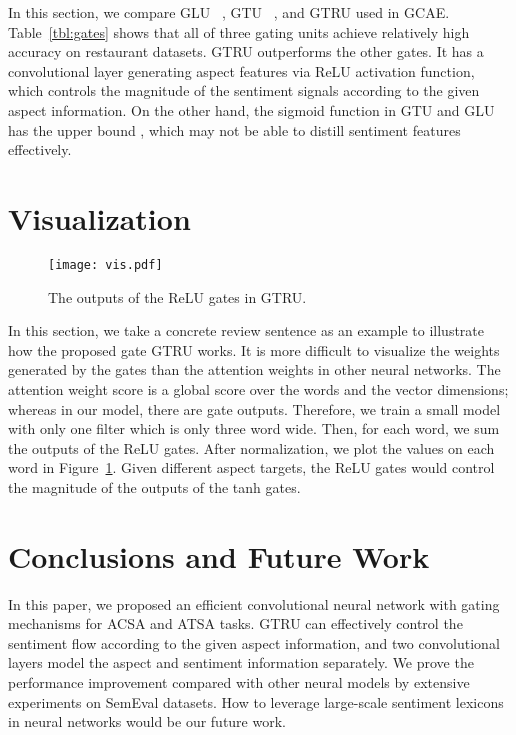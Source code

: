 \documentclass[11pt,a4paper]{article}
\begin{document}
In this section, we compare 
GLU  ~\cite{Dauphin:2016uja}, 
GTU  ~\cite{vandenOord:2016tk}, 
and GTRU used in GCAE. 
Table~\ref{tbl:gates} shows that all of three gating units achieve relatively high accuracy on restaurant datasets. GTRU outperforms the other gates. It has a convolutional layer generating aspect features via ReLU activation function, which controls the magnitude of the sentiment signals according to the given aspect information. On the other hand, the sigmoid function in GTU and GLU has the upper bound , which may not be able to distill sentiment features effectively.

\section{Visualization}
\begin{figure}
  \centering
  \texttt{[image: vis.pdf]}
  \caption{The outputs of the ReLU gates in GTRU.} 
  \label{fig:vis}
\end{figure}
In this section, we take a concrete review sentence as an example to illustrate how the proposed gate GTRU works. It is more difficult to visualize the weights generated by the gates than the attention weights in other neural networks. The attention weight score is a global score over the words and the vector dimensions; whereas in our model, there are  gate outputs. Therefore, we train a small model with only one filter which is only three word wide. Then, for each word, we sum the  outputs of the ReLU gates. After normalization, we plot the values on each word in Figure~\ref{fig:vis}. Given different aspect targets, the ReLU gates would control the magnitude of the outputs of the tanh gates. 


\section{Conclusions and Future Work}
In this paper, we proposed an efficient convolutional neural network with gating mechanisms for ACSA and ATSA tasks. 
GTRU can effectively control the sentiment flow according to the given aspect information, and two convolutional layers model the aspect and sentiment information separately.
We prove the performance improvement compared with other neural models by extensive experiments on SemEval datasets. 
How to leverage large-scale sentiment lexicons in neural networks would be our future work.  




\end{document}
